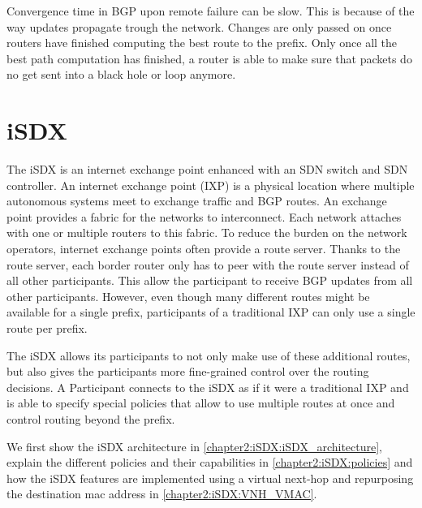 Convergence time in BGP upon remote failure can be slow.
This is because of the way updates propagate trough the network. Changes are only passed on once routers have finished computing the best route to the prefix. Only once all the best path computation has finished, a router is able to make sure that packets do no get sent into a black hole or loop anymore.



\section{\label{chapter2:iSDX}iSDX}

The iSDX is an internet exchange point enhanced with an SDN switch and SDN controller.
An internet exchange point (IXP) is a physical location where multiple autonomous systems meet to exchange traffic and BGP routes. An exchange point provides a fabric for the networks to interconnect. Each network attaches with one or multiple routers to this fabric. To reduce the burden on the network operators, internet exchange points often provide a route server. Thanks to the route server, each border router only has to peer with the route server instead of all other participants. This allow the participant to receive BGP updates from all other participants. However, even though many different routes might be available for a single prefix, participants of a traditional IXP can only use a single route per prefix.

The iSDX allows its participants to not only make use of these additional routes, but also gives the participants  more fine-grained control over the routing decisions. A Participant connects to the iSDX as if it were a traditional IXP and is able to specify special policies that allow to use multiple routes at once and control routing beyond the prefix.

We first show the iSDX architecture in \ref{chapter2:iSDX:iSDX_architecture}, explain the different policies and their capabilities in \ref{chapter2:iSDX:policies} and how the iSDX features are implemented using a virtual next-hop and repurposing the destination mac address in \ref{chapter2:iSDX:VNH_VMAC}.

